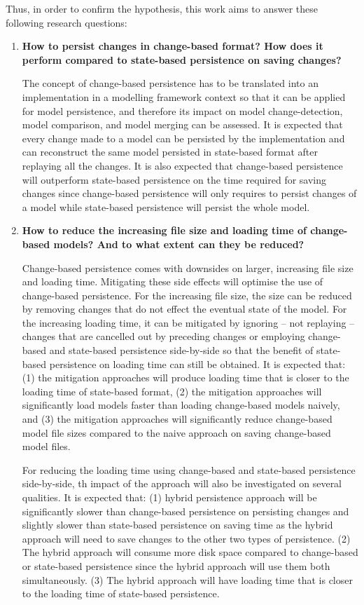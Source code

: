 \documentclass[12pt, a4paper]{report} \usepackage[titletoc]{appendix}
\begin{document}
Thus, in order to confirm the hypothesis, this work aims to answer these following research questions: 
\begin{enumerate} 
	\item \textbf{How to persist changes in change-based format? How does it perform compared to state-based persistence on saving changes?} 
	
	The concept of change-based persistence has to be translated into an implementation in a modelling framework context so that it can be applied for model persistence, and therefore its impact on model change-detection, model comparison, and model merging can be assessed. It is expected that every change made to a model can be persisted by the implementation and can reconstruct the same model persisted in state-based format after replaying all the changes. It is also expected that change-based persistence will outperform state-based persistence on the time required for saving changes since change-based persistence will only requires to persist changes of a model while state-based persistence will persist the whole model. 
	
	\item \textbf{How to reduce the increasing file size and loading time of change-based models? And to what extent can they be reduced?} 
	
	Change-based persistence comes with downsides on larger, increasing file size and loading time. Mitigating these side effects will optimise the use of change-based persistence. For the increasing file size, the size can be reduced by removing changes that do not effect the eventual state of the model. For the increasing loading time, it can be mitigated by ignoring -- not replaying -- changes that are cancelled out by preceding changes or employing change-based and state-based persistence side-by-side so that the benefit of state-based persistence on loading time can still be obtained. It is expected that: (1) the mitigation approaches will produce loading time that is closer to the loading time of state-based format, (2) the mitigation approaches will significantly load models faster than loading change-based models naively, and (3) the mitigation approaches will significantly reduce change-based model file sizes compared to the naive approach on saving change-based model files. 

	For reducing the loading time using change-based and state-based persistence side-by-side, th impact of the approach will also be investigated on several qualities. It is expected that: (1) hybrid persistence approach will be significantly slower than change-based persistence on persisting changes and slightly slower than state-based persistence on saving time as the hybrid approach will need to save changes to the other two types of persistence. (2) The hybrid approach will consume more disk space compared to change-based or state-based persistence since the hybrid approach will use them both simultaneously. (3) The hybrid approach will have loading time that is closer to the loading time of state-based persistence. 
    

\end{enumerate}
\end{document}
